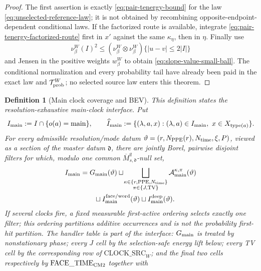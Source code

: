 \documentclass[11pt]{article}
\newtheorem{definition}[theorem]{Definition}
\begin{document}
\begin{proof}
The first assertion is exactly \eqref{eq:pair-tenergy-bound} for the law
\eqref{eq:unselected-reference-law}; it is not obtained by recombining
opposite-endpoint-dependent conditional laws.  If the factorized route is
available, integrate \eqref{eq:pair-tenergy-factorized-route} first in
$x'$ against the same $\kappa_\eta$, then in $\eta$.  Finally use
\[
 \nu_\beta^{W}(I)^2\le
 (\nu_\beta^{W}\otimes\nu_\beta^{W})\{|u-v|\le2|I|\}
\]
and Jensen in the positive weights $w_\beta^{W}$ to obtain
\eqref{eq:slope-value-small-ball}.  The conditional normalization and every
probability tail have already been paid in the exact law and
$\mathcal T_{\rm prob}^{W}$; no selected source law enters this theorem.
\end{proof}

\begin{definition}[Main clock coverage and BEV]
\label{def:main-source-BEV}
This definition states the resolution-exhaustive main-clock interface.  Put
\[
 I_{\rm main}:=I\cap\{o(a)={\rm main}\},
 \qquad
 \widehat I_{\rm main}:=
 \{(\lambda,a,x):(\lambda,a)\in I_{\rm main},\
                    x\in X_{\operatorname{type}(a)}\}.
\]
For every admissible resolution/mode datum
$\vartheta=(r,N_{\rm PPE}(r),N_{\rm time},\xi,P)$, viewed as a section of
the master datum $\mathfrak d$, there are jointly Borel,
pairwise disjoint filters for which, modulo one common
$\overline M_{s,\mathfrak d}^{q}$-null set,
\begin{equation}
\label{eq:main-clock-coverage}
\begin{aligned}
 I_{\rm main}
 &=G_{\rm main}(\vartheta)
 \sqcup\!\bigsqcup_{\substack{
      \kappa\in\{r,{\rm PPE},N_{\rm time}\}\\
      \pi\in\{J,{\rm TV}\}}}
      \mathcal A_{\rm main}^{\kappa,\pi}(\vartheta)\\
 &\qquad\sqcup I_{\rm main}^{\rm face/word}(\vartheta)
 \sqcup I_{\rm main}^{\rm deep}(\vartheta).
\end{aligned}
\end{equation}
If several clocks fire, a fixed measurable first-active ordering selects
exactly one filter; this ordering partitions additive occurrences and is not
the probability first-hit partition.  The handler table is part of the
interface: $G_{\rm main}$ is treated by nonstationary phase; every $J$ cell
by the selection-safe energy lift below; every TV cell by the corresponding
row of $\mathrm{CLOCK\_SRC}_{W}$; and the final two cells respectively by
$\mathrm{FACE\_TIME}_{\rm CM2}$ together with

\end{definition}
\end{document}
